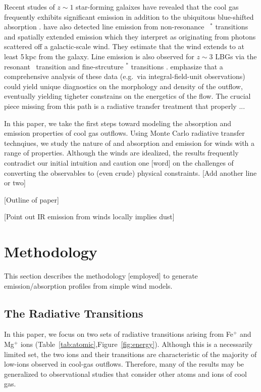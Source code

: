 \documentclass[12pt,preprint]{aastex}
\begin{document}
Recent studes of $z \sim 1$ star-forming galaixes have revealed that
the cool gas frequently exhibits significant  emission in
addition to the ubiquitous blue-shifted absorption
\citep{wcp+09,rubin+10b}.  \cite{rubin+10a} have also detected line
emission from non-resonance ~$^*$ transitions and spatially
extended  emission which they interpret as originating from
photons scattered off a galactic-scale wind.  They estimate that the
wind extends to at least 5\,kpc from the galaxy.  Line emission is
also observed for $z \sim 3$ LBGs via the resonant \lya\ transition
and fine-strcuture $^*$ transitions \citep{cb58,shapley}.
\cite{rubin+10a} emphasize that a comprehensive analysis of these data
(e.g.\ via integral-field-unit observations) could yield unique
diagnostics on the morphology and density of the outflow, eventually
yielding tigheter constrains on the energetics of the flow.  
The crucial piece missing from this path is a radiative transfer
treatment that properly ...

In this paper, we take the first steps toward modeling the absorption
and emission properties of cool gas outflows.  Using Monte Carlo
radiative transfer technqiues, we study the nature of  and
 absorption and emission for winds with a range of
properties.  Although the winds are idealized, the results frequently
contradict our initial intuition and caution one [word] on the
challenges of converting the observables to (even crude) physical
constraints.  [Add another line or two]

[Outline of paper]


[Point out IR emission from winds locally implies dust]

\section{Methodology}
\label{sec:method}

This section describes the methodology [employed] to generate
emission/absorption profiles from simple wind models.

\subsection{The Radiative Transitions}

In this paper, we focus on two sets of radiative transitions
arising from Fe$^+$ and Mg$^+$ ions
(Table~\ref{tab:atomic},Figure~\ref{fig:energy}).
Although this is a necessarily limited
set, the two ions and their transitions are characteristic
of the majority of low-ions 
observed in cool-gas outflows. Therefore, many
of the results may be generalized to observational studies that
consider other atoms and ions of cool gas.
\end{document}
